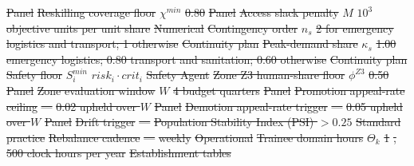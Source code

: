 \documentclass[utf8]{FrontiersinHarvard}
\providecommand{\DIFdel}[1]{{\protect\color{red}\sout{#1}}}                      %
\providecommand{\DIFdelFL}[1]{\DIFdel{#1}} %
\begin{document}
\DIFdelFL{Panel}%
\DIFdelFL{Reskilling coverage floor }%
\DIFdelFL{$\chi^{min}$ }%
\DIFdelFL{0.80 }%
\DIFdelFL{Panel}%
\DIFdelFL{Access slack penalty }%
\DIFdelFL{$M$ }%
\DIFdelFL{$10^{3}$ objective units per unit share }%
\DIFdelFL{Numerical}%
\DIFdelFL{Contingency order }%
\DIFdelFL{$n_s$ }%
\DIFdelFL{2 for emergency logistics and transport; 1 otherwise }%
\DIFdelFL{Continuity plan}%
\DIFdelFL{Peak-demand share }%
\DIFdelFL{$\kappa_s$ }%
\DIFdelFL{1.00 emergency logistics; 0.80 transport and sanitation; 0.60 otherwise }%
\DIFdelFL{Continuity plan}%
\DIFdelFL{Safety floor }%
\DIFdelFL{$S^{min}_i$ }%
\DIFdelFL{$risk_i\cdot crit_i$ }%
\DIFdelFL{Safety Agent}%
\DIFdelFL{Zone Z3 human-share floor }%
\DIFdelFL{$\phi^{Z3}$ }%
\DIFdelFL{0.50 }%
\DIFdelFL{Panel}%
\DIFdelFL{Zone evaluation window }%
\DIFdelFL{$W$ }%
\DIFdelFL{4 budget quarters }%
\DIFdelFL{Panel}%
\DIFdelFL{Promotion appeal-rate ceiling }%
\DIFdelFL{--- }%
\DIFdelFL{0.02 upheld over $W$ }%
\DIFdelFL{Panel}%
\DIFdelFL{Demotion appeal-rate trigger }%
\DIFdelFL{--- }%
\DIFdelFL{0.05 upheld over $W$ }%
\DIFdelFL{Panel}%
\DIFdelFL{Drift trigger }%
\DIFdelFL{--- }%
\DIFdelFL{Population Stability Index (PSI) $>0.25$ }%
\DIFdelFL{Standard practice}%
\DIFdelFL{Rebalance cadence }%
\DIFdelFL{--- }%
\DIFdelFL{weekly }%
\DIFdelFL{Operational}%
\DIFdelFL{Trainee domain hours }%
\DIFdelFL{$\Theta_k$ }%
\DIFdelFL{1}%
\DIFdelFL{,}%
\DIFdelFL{500 clock hours per year }%
\DIFdelFL{Establishment tables}%
\end{document}
